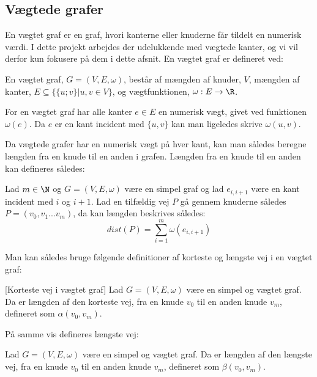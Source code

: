 \subsection{Vægtede grafer}
En vægtet graf er en graf, hvori kanterne eller knuderne får tildelt en numerisk værdi. I dette projekt arbejdes der udelukkende med vægtede kanter, og vi vil derfor kun fokusere på dem i dette afsnit.
En vægtet graf er defineret ved:
\begin{defn}
En vægtet graf, $G=(V,E, \omega)$, består af mængden af knuder, $V$, mængden af kanter, $E \subseteq \{\{u;v\}|u,v \in V\}$, og vægtfunktionen, $\omega: E \rightarrow \R$.
\end{defn}


For en vægtet graf har alle kanter $e\in E$ en numerisk vægt, givet ved funktionen $\omega (e)$. Da $e$ er en kant incident med $\{u,v\}$ kan man  ligeledes skrive $\omega (u,v)$.


Da vægtede grafer har en numerisk vægt på hver kant, kan man således beregne længden fra en knude til en anden i grafen. Længden fra en knude til en anden kan defineres således:

\begin{defn}
Lad $m\in \N $ og $G=(V,E,\omega)$ være en simpel graf og lad $e_{i,i+1}$ være en kant incident med $i$ og $i+1$. Lad en tilfældig vej $P$ gå gennem knuderne således $P=(v_0,v_1...v_m)$, da kan længden beskrives således:
	\begin{equation*}
	dist(P)=\sum_{i=1}^{m}\omega(e_{i,i+1})
	\end{equation*}  
\end{defn}

Man kan således bruge følgende definitioner af korteste og længste vej i en vægtet graf:


\begin{defn} \label{defn:min.vej} [Korteste vej i vægtet graf]
Lad $G=(V,E,\omega)$ være en simpel og vægtet graf. Da er længden af den korteste vej, fra en knude $v_0$ til en anden knude $v_m$, defineret som $\alpha(v_0,v_m)$.
\end{defn}

På samme vis defineres længste vej:

\begin{defn} 
Lad $G=(V,E,\omega)$ være en simpel og vægtet graf. Da er længden af den længste vej, fra en knude $v_0$ til en anden knude $v_m$, defineret som $\beta(v_0,v_m)$.
\end{defn}

